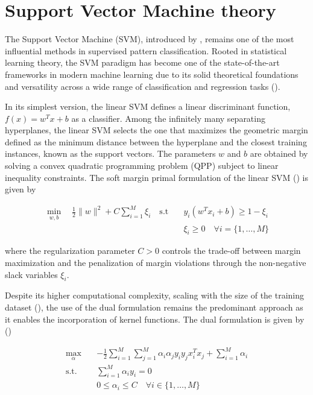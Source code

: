 \documentclass[12pt]{report} %
\begin{document}
\section{Support Vector Machine theory} \label{sec:svm-theory}

The Support Vector Machine (SVM), introduced by \cite{vapnik1998statistical}, remains one of the most influential methods in supervised pattern classification. Rooted in statistical learning theory, the SVM paradigm has become one of the state-of-the-art frameworks in modern machine learning due to its solid theoretical foundations and versatility across a wide range of classification and regression tasks (\cite{khan2012novel,lin2006method}).

In its simplest version, the linear SVM defines a linear discriminant function, $f(x) = w^{T}x+b$ as a classifier. Among the infinitely many separating hyperplanes, the linear SVM selects the one that maximizes the geometric margin defined as the minimum distance between the hyperplane and the closest training instances, known as the support vectors. The parameters $w$ and $b$ are obtained by solving a convex quadratic programming problem (QPP) subject to linear inequality constraints. The soft margin primal formulation of the linear SVM (\cite{bishop2006pattern, cristianini2000introduction}) is given by

\begin{equation}
\begin{aligned}
\min_{w,b} \quad \frac{1}{2}\|w\|^{2} + C\sum_{i=1}^{M}\xi_i
\quad \text{s.t} \quad & y_i(w^{T}x_i+b) \geq 1-\xi_i \\
& \xi_i \geq 0\quad \forall i = \{1,\dots,M\}
\label{eq:svm_primal}
\end{aligned}
\end{equation}

where the regularization parameter $C >0$ controls the trade-off between margin maximization and the penalization of margin violations through the non-negative slack variables $\xi_i$. 

\newpage

Despite its higher computational complexity, scaling with the size of the training dataset (\cite{chapelle2007training}), the use of the dual formulation remains the predominant approach as it enables the incorporation of kernel functions. The dual formulation is given by (\cite{hofmann2006support})

\begin{equation}
\begin{aligned}
\max_{\alpha} \quad & -\frac{1}{2}\sum_{i=1}^{M}\sum_{j=1}^{M}\alpha_i\alpha_jy_iy_jx_i^{T}x_j + \sum_{i=1}^{M}\alpha_i \\
\text{s.t.} \quad & \sum_{i=1}^{M}\alpha_iy_i = 0 \\
\quad  & 0 \leq \alpha_i \leq C \quad \forall i \in \{1,\dots, M\}
\label{eq:svm_dual}
\end{aligned}
\end{equation}
\end{document}
